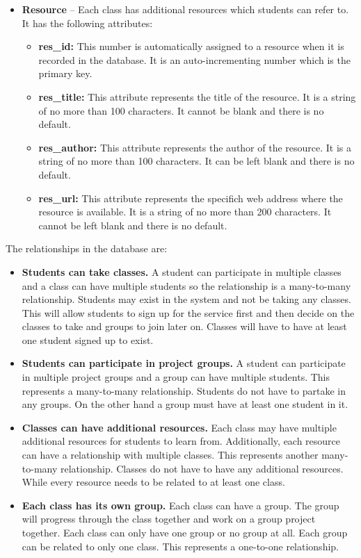 \documentclass[12pt]{article}
\begin{document}
\begin{itemize}
	\item \textbf{Resource} -- Each class has additional resources which students can refer to. It has the following attributes:
	\begin{itemize}
		\item \textbf{res\_id:} This number is automatically assigned to a resource when it is recorded in the database. It is an auto-incrementing number which is the primary key.
		\item \textbf{res\_title:} This attribute represents the title of the resource. It is a string of no more than 100 characters. It cannot be blank and there is no default. 
		\item \textbf{res\_author:} This attribute represents the author of the resource. It is a string of no more than 100 characters. It can be left blank and there is no default. 
		\item \textbf{res\_url:} This attribute represents the specifich web address where the resource is available. It is a string of no more than 200 characters. It cannot be left blank and there is no default. 
	\end{itemize}
\end{itemize}

The relationships in the database are:
\begin{itemize}
	\item \textbf{Students can take classes.} A student can participate in multiple classes and a class can have multiple students so the relationship is a many-to-many relationship. Students may exist in the system and not be taking any classes. This will allow students to sign up for the service first and then decide on the classes to take and groups to join later on. Classes will have to have at least one student signed up to exist. 

	\item \textbf{Students can participate in project groups.} A student can participate in multiple project groups and a group can have multiple students. This represents  a many-to-many relationship. Students do not have to partake in any groups. On the other hand a group must have at least one student in it. 
	
	\item \textbf{Classes can have additional resources.} Each class may have multiple additional resources for students to learn from. Additionally, each resource can have a relationship with multiple classes. This represents another many-to-many relationship. Classes do not have to have any additional resources. While every resource needs to be related to at least one class. 
	
	\item \textbf{Each class has its own group.} Each class can have a group. The group will progress through the class together and work on a group project together. Each class can only have one group or no group at all. Each group can be related to only one class. This represents a one-to-one relationship. 

\end{itemize}



\end{document}

